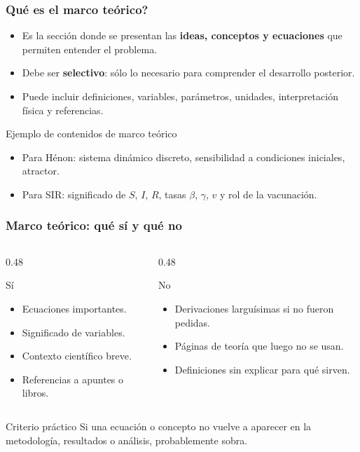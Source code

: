 \begin{frame}
\frametitle{\textquestiondown{}Qu\'e es el marco te\'orico?}
\begin{itemize}
    \item Es la secci\'on donde se presentan las \textbf{ideas, conceptos y ecuaciones} que permiten entender el problema.
    \item Debe ser \textbf{selectivo}: s\'olo lo necesario para comprender el desarrollo posterior.
    \item Puede incluir definiciones, variables, par\'ametros, unidades, interpretaci\'on f\'isica y referencias.
\end{itemize}

\vspace{0.2cm}
\begin{block}{Ejemplo de contenidos de marco te\'orico}
\begin{itemize}
    \item Para H\'enon: sistema din\'amico discreto, sensibilidad a condiciones iniciales, atractor.
    \item Para SIR: significado de $S$, $I$, $R$, tasas $\beta$, $\gamma$, $v$ y rol de la vacunaci\'on.
\end{itemize}
\end{block}
\end{frame}

\begin{frame}
\frametitle{Marco te\'orico: qu\'e s\'i y qu\'e no}
\begin{columns}[T]
\begin{column}{0.48\textwidth}
\begin{block}{S\'i}
\begin{itemize}
    \item Ecuaciones importantes.
    \item Significado de variables.
    \item Contexto cient\'ifico breve.
    \item Referencias a apuntes o libros.
\end{itemize}
\end{block}
\end{column}
\begin{column}{0.48\textwidth}
\begin{block}{No}
\begin{itemize}
    \item Derivaciones largu\'isimas si no fueron pedidas.
    \item P\'aginas de teor\'ia que luego no se usan.
    \item Definiciones sin explicar para qu\'e sirven.
\end{itemize}
\end{block}
\end{column}
\end{columns}

\vspace{0.2cm}
\begin{alertblock}{Criterio pr\'actico}
Si una ecuaci\'on o concepto no vuelve a aparecer en la metodolog\'ia, resultados o an\'alisis, probablemente sobra.
\end{alertblock}
\end{frame}

